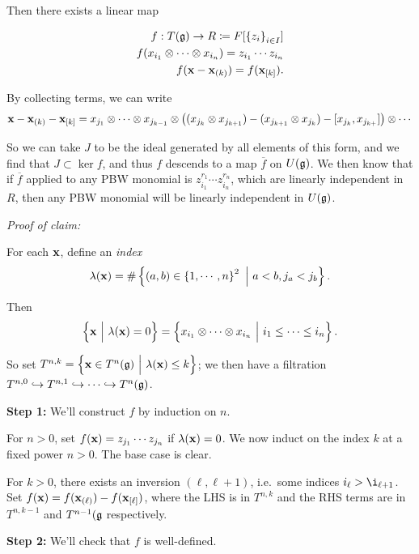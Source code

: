 Then there exists a linear map

\begin{align*}
f: T({\mathfrak{g}}) \to R \coloneqq F[\left\{{z_i}\right\}_{i\in I}] \\
f(x_{i_1} \otimes \cdots \otimes x_{i_n}) = z_{i_1} \cdots z_{i_n} \\
f(\mathbf{x} - \mathbf{x}_{(k)}) = f(\mathbf{x}_{[k]})
.\end{align*}

By collecting terms, we can write \[
\mathbf{x} - \mathbf{x}_{(k)} - \mathbf{x}_{[k]} = x_{j_1} \otimes \cdots \otimes x_{j_{k-1}} \otimes \left( (x_{j_k} \otimes x_{j_{k+1}}) - (x_{j_{k+1}} \otimes x_{j_k}) - [x_{j_k}, x_{j_{k+}}]   \right) \otimes \cdots
\]

So we can take \(J\) to be the ideal generated by all elements of this
form, and we find that \(J \subset \ker f\), and thus \(f\) descends to
a map \(\overline f\) on \(U({\mathfrak{g}})\). We then know that if
\(\overline f\) applied to any PBW monomial is
\(z_{i_1}^{r_1} \cdots z_{i_n}^{r_n}\), which are linearly independent
in \(R\), then any PBW monomial will be linearly independent in
\(U({\mathfrak{g}})\).

\emph{Proof of claim:}

For each \(\mathbf{x}\), define an \emph{index} \[
\lambda(\mathbf{x}) = \#\left\{{ (a,b) \in \left\{{1, \cdots, n}\right\}^2 {~\mathrel{\Big|}~} a<b, j_a < j_b  }\right\}.
\]

Then \[
\left\{{\mathbf{x} {~\mathrel{\Big|}~} \lambda(\mathbf{x}) = 0}\right\} = \left\{{ x_{i_1} \otimes \cdots \otimes x_{i_n} {~\mathrel{\Big|}~} i_1 \leq \cdots \leq i_n }\right\}.  
\]

So set
\(T^{n, k} = \left\{{\mathbf{x} \in T^n({\mathfrak{g}}) {~\mathrel{\Big|}~} \lambda(\mathbf{x}) \leq k}\right\}\);
we then have a filtration
\(T^{n, 0} \hookrightarrow T^{n, 1} \hookrightarrow \cdots \hookrightarrow T^n({\mathfrak{g}})\).

\textbf{Step 1:} We'll construct \(f\) by induction on \(n\).

For \(n> 0\), set \(f(\mathbf{x}) = z_{j_1} \cdots z_{j_n}\) if
\(\lambda(\mathbf{x}) = 0\). We now induct on the index \(k\) at a fixed
power \(n > 0\). The base case is clear.

For \(k>0\), there exists an inversion \((\ell, \ell+1)\), i.e.~some
indices \(i_{\ell} > \i_{\ell+1}\). Set
\(f(\mathbf{x}) = f(\mathbf{x}_{(\ell)}) - f(\mathbf{x}_{[\ell]})\), where
the LHS is in \(T^{n, k}\) and the RHS terms are in \(T^{n, k-1}\) and
\(T^{n-1}({\mathfrak{g}}\) respectively.

\textbf{Step 2:} We'll check that \(f\) is well-defined.

